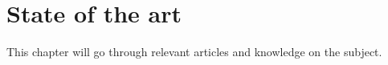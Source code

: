 \chapter{State of the art}
This chapter will go through relevant articles and knowledge on the subject.
